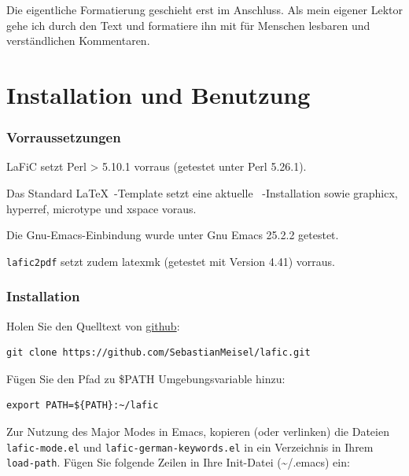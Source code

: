 \documentclass{scrartcl}
\begin{document}
{Die eigentliche Formatierung geschieht erst im
Anschluss. Als mein eigener Lektor gehe ich durch den Text
und formatiere ihn mit für Menschen lesbaren und
verständlichen Kommentaren.\\}

\part{Installation und Benutzung}

\section{Vorraussetzungen}

{LaFiC setzt Perl > 5.10.1 vorraus (getestet unter Perl 5.26.1).\\}

{Das Standard \LaTeX\ -Template setzt eine aktuelle
\XeLaTeX\ -Installation sowie graphicx, hyperref, microtype und
xspace voraus.\\}

{Die Gnu-Emacs-Einbindung wurde unter Gnu Emacs 25.2.2 getestet.\\}

{\texttt{lafic2pdf} setzt zudem latexmk (getestet mit Version 4.41) vorraus.\\}

\section{Installation}
\label{Installation}

{Holen Sie den Quelltext von \href{https://github.com}{github}:\\}

\begin{verbatim}
git clone https://github.com/SebastianMeisel/lafic.git
\end{verbatim}


{Fügen Sie den Pfad zu \$PATH Umgebungsvariable hinzu:\\}

\begin{verbatim}
export PATH=${PATH}:~/lafic
\end{verbatim}


{Zur Nutzung des Major Modes in Emacs, kopieren (oder
verlinken) die Dateien \texttt{lafic-mode.el} und
\texttt{lafic-german-keywords.el} in ein Verzeichnis in Ihrem
\texttt{load-path}. Fügen Sie folgende Zeilen in Ihre Init-Datei
(\textasciitilde /.emacs) ein:\\}
\end{document}
